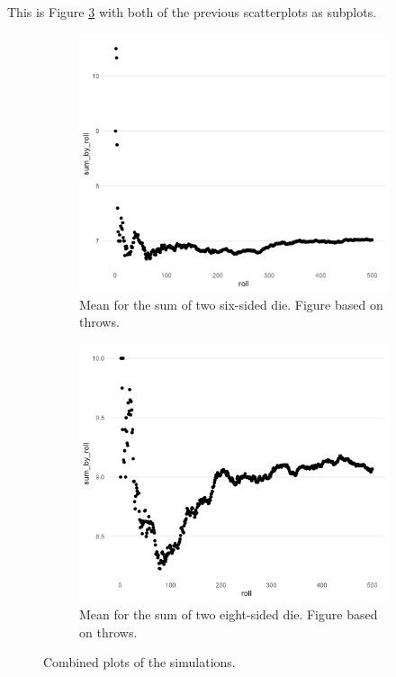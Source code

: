 \documentclass[12pt]{article}
\theoremstyle{definition}
\begin{document}
This is Figure \ref{fig:figsubplots} with both of the previous scatterplots as subplots. 

\begin{figure}[tbh!]
\begin{subfigure}{.5\textwidth}
  \centering
  \includegraphics[width=.8\linewidth]{plot/baseline/lln_plot_baseline.png}  
  \caption{Mean for the sum of two six-sided die. Figure based on throws.}
  \label{fig:sub-first}
\end{subfigure}
\begin{subfigure}{.5\textwidth}
  \centering
  \includegraphics[width=.8\linewidth]{plot/500_8/lln_plot_500_8.png}  
  \caption{Mean for the sum of two eight-sided die. Figure based on throws.}
  \label{fig:sub-second}
\end{subfigure}
\caption{Combined plots of the simulations.}
\label{fig:figsubplots}
\end{figure}
\end{document}
